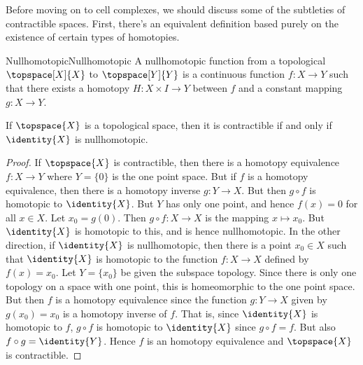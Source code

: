 \documentclass[oneside]{book}                                                  %
\begin{document}
                Before moving on to cell complexes, we should discuss some of
                the subtleties of contractible spaces. First, there's an
                equivalent definition based purely on the existence of certain
                types of homotopies.
                \begin{fdefinition}{Nullhomotopic}{Nullhomotopic}
                    A nullhomotopic function from a topological
                    $\topspace[X]{X}$ to $\topspace[Y]{Y}$ is a continuous
                    function $f:X\rightarrow{Y}$ such that there exists a
                    homotopy $H:X\times{I}\rightarrow{Y}$ between $f$ and a
                    constant mapping $g:X\rightarrow{Y}$.
                \end{fdefinition}
                \begin{theorem}
                    If $\topspace{X}$ is a topological space, then it is
                    contractible if and only if $\identity{X}$ is nullhomotopic.
                \end{theorem}
                \begin{proof}
                    If $\topspace{X}$ is contractible, then there is a homotopy
                    equivalence $f:X\rightarrow{Y}$ where $Y=\{0\}$ is the
                    one point space. But if $f$ is a homotopy equivalence, then
                    there is a homotopy inverse $g:Y\rightarrow{X}$. But then
                    $g\circ{f}$ is homotopic to $\identity{X}$. But $Y$ has only
                    one point, and hence $f(x)=0$ for all $x\in{X}$. Let
                    $x_{0}=g(0)$. Then $g\circ{f}:X\rightarrow{X}$ is the
                    mapping $x\mapsto{x}_{0}$. But $\identity{X}$ is homotopic
                    to this, and is hence nullhomotopic. In the other direction,
                    if $\identity{X}$ is nullhomotopic, then there is a point
                    $x_{0}\in{X}$ such that $\identity{X}$ is homotopic to the
                    function $f:X\rightarrow{X}$ defined by $f(x)=x_{0}$. Let
                    $Y=\{x_{0}\}$ be given the subspace topology. Since there is
                    only one topology on a space with one point, this is
                    homeomorphic to the one point space. But then $f$ is a
                    homotopy equivalence since the function $g:Y\rightarrow{X}$
                    given by $g(x_{0})=x_{0}$ is a homotopy inverse of $f$. That
                    is, since $\identity{X}$ is homotopic to $f$,
                    $g\circ{f}$ is homotopic to $\identity{X}$ since
                    $g\circ{f}=f$. But also $f\circ{g}=\identity{Y}$. Hence $f$
                    is an homotopy equivalence and $\topspace{X}$ is
                    contractible.
                \end{proof}
\end{document}
